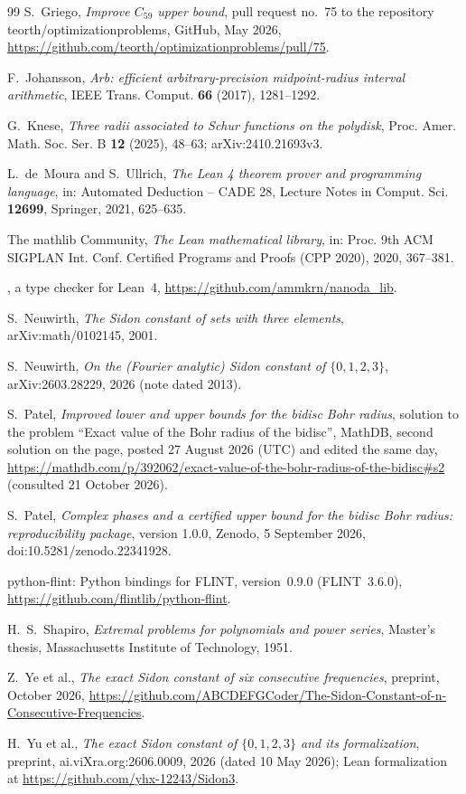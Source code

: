 \documentclass[11pt]{amsart}
\theoremstyle{remark}
\numberwithin{equation}{section}
\newcommand{\lean}[1]{\texttt{\detokenize{#1}}}
\begin{document}
\begin{thebibliography}{99}
 S.~Griego, \emph{Improve $C_{59}$ upper bound}, pull request no.~75 to the repository teorth/optimizationproblems, GitHub, May 2026, \url{https://github.com/teorth/optimizationproblems/pull/75}.

 F.~Johansson, \emph{Arb: efficient arbitrary-precision midpoint-radius interval arithmetic}, IEEE Trans. Comput. \textbf{66} (2017), 1281--1292.

 G.~Knese, \emph{Three radii associated to Schur functions on the polydisk}, Proc. Amer. Math. Soc. Ser. B \textbf{12} (2025), 48--63; arXiv:2410.21693v3.

 L.~de~Moura and S.~Ullrich, \emph{The Lean 4 theorem prover and programming language}, in: Automated Deduction -- CADE 28, Lecture Notes in Comput. Sci. \textbf{12699}, Springer, 2021, 625--635.

 The mathlib Community, \emph{The Lean mathematical library}, in: Proc. 9th ACM SIGPLAN Int. Conf. Certified Programs and Proofs (CPP 2020), 2020, 367--381.

 \lean{nanoda_lib}, a type checker for Lean~4, \url{https://github.com/ammkrn/nanoda_lib}.

 S.~Neuwirth, \emph{The Sidon constant of sets with three elements}, arXiv:math/0102145, 2001.

 S.~Neuwirth, \emph{On the (Fourier analytic) Sidon constant of $\{0,1,2,3\}$}, arXiv:2603.28229, 2026 (note dated 2013).

 S.~Patel, \emph{Improved lower and upper bounds for the bidisc Bohr radius}, solution to the problem ``Exact value of the Bohr radius of the bidisc'', MathDB, second solution on the page, posted 27 August 2026 (UTC) and edited the same day, \url{https://mathdb.com/p/392062/exact-value-of-the-bohr-radius-of-the-bidisc#s2} (consulted 21 October 2026).

 S.~Patel, \emph{Complex phases and a certified upper bound for the bidisc Bohr radius: reproducibility package}, version 1.0.0, Zenodo, 5 September 2026, doi:10.5281/zenodo.22341928.

 python-flint: Python bindings for FLINT, version~0.9.0 (FLINT~3.6.0), \url{https://github.com/flintlib/python-flint}.

 H.~S.~Shapiro, \emph{Extremal problems for polynomials and power series}, Master's thesis, Massachusetts Institute of Technology, 1951.

 Z.~Ye et al., \emph{The exact Sidon constant of six consecutive frequencies}, preprint, October 2026, \url{https://github.com/ABCDEFGCoder/The-Sidon-Constant-of-n-Consecutive-Frequencies}.

 H.~Yu et al., \emph{The exact Sidon constant of $\{0,1,2,3\}$ and its formalization}, preprint, ai.viXra.org:2606.0009, 2026 (dated 10 May 2026); Lean formalization at \url{https://github.com/yhx-12243/Sidon3}.

\end{thebibliography}
\end{document}
